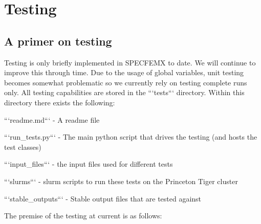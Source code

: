 \chapter{Testing}
\label{chap:testing}
\section{A primer on testing}


Testing is only briefly implemented in SPECFEMX to date. We will continue to improve this through time. Due to the usage of global variables, unit testing becomes somewhat problematic so we currently rely on testing complete runs only. All testing capabilities are stored in the ```tests``` directory. Within this directory there exists the following: 
\begin{\itemize}
\item ```readme.md``` - A readme file 
\item ```run_tests.py``` - The main python script that drives the testing (and hosts the test classes)
\item ```input_files``` - the input files used for different tests  
\item ```slurms``` - slurm scripts to run these tests on the Princeton Tiger cluster 
\item ```stable_outputs``` - Stable output files that are tested against 
\end{\itemize}

The premise of the testing at current is as follows: 
\begin{enumerate}
\end{enumerate}